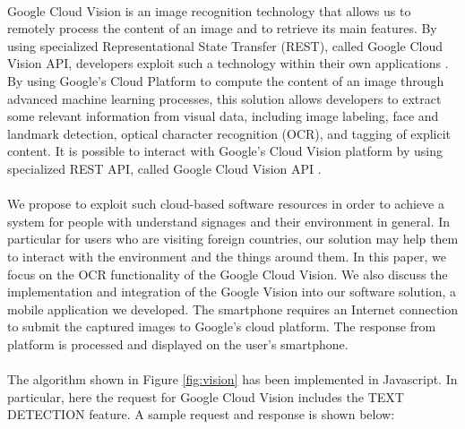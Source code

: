 \documentclass[12pt]{article}
\begin{document}
\paragraph{}Google Cloud Vision is an image recognition technology that allows us to remotely process the content of an image and to retrieve its main features. By using specialized  Representational State Transfer (REST), called Google Cloud Vision API, developers exploit such a technology within their own applications \cite{vision}. By using Google’s Cloud Platform to compute the content of an image through advanced machine learning processes, this solution allows developers to extract some relevant information from visual data, including image labeling, face and landmark detection, optical character recognition (OCR), and tagging of explicit content. It is possible to interact with Google’s Cloud Vision platform by using specialized REST API, called Google Cloud Vision API \cite{vision}.

\paragraph{}We propose to exploit such cloud-based software resources in order to achieve a system for people with understand signages and their environment in general. In particular for users who are visiting foreign countries, our solution may help them to interact with the environment and the things around them. In this paper, we focus on the OCR functionality of the Google Cloud Vision. We also discuss the implementation and integration of the Google Vision into our software solution, a mobile application we developed. The smartphone requires an Internet connection to submit the captured images to Google’s cloud platform. The response from platform is processed and displayed on the user's smartphone.

\paragraph{}The algorithm shown in Figure \ref{fig:vision} has been implemented in Javascript. In particular, here the request for Google Cloud Vision includes the TEXT DETECTION feature. A sample request and response is shown below:
\end{document}
